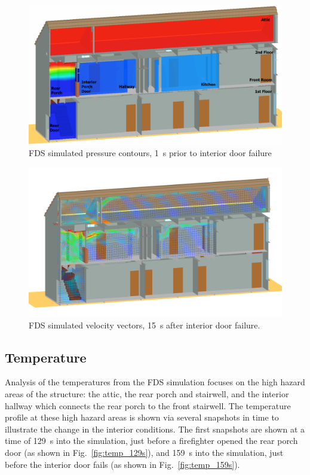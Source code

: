 \begin{figure}[!ht]
\includegraphics[width=.75\textwidth]{../Figures/west_50th_baseline_pres2}

\caption[FDS simulated pressure contours, 1~s prior to interior door failure.]{FDS simulated pressure contours, 1~s prior to interior door failure}
\label{fig:pres_159s}
\end{figure}

\newpage
\begin{landscape}
\centering
\begin{figure}[!ht]
\includegraphics[width=1.1\textwidth]{../Figures/west_50th_baseline_velo_175}


\caption{FDS simulated velocity vectors, 15~s after interior door failure.}
\label{fig:velo_175s}
\end{figure}
\end{landscape}
\newpage

\subsection{Temperature}
\label{temp}
Analysis of the temperatures from the FDS simulation focuses on the high hazard areas of the structure: the attic, the rear porch and stairwell, and the interior hallway which connects the rear porch to the front stairwell. The temperature profile at these high hazard areas is shown via several snapshots in time to illustrate the change in the interior conditions. The first snapshots are shown at a time of 129~s into the simulation, just before a firefighter opened the rear porch door (as shown in Fig.~\ref{fig:temp_129s}), and 159~s into the simulation, just before the interior door fails (as shown in Fig.~\ref{fig:temp_159s}).

